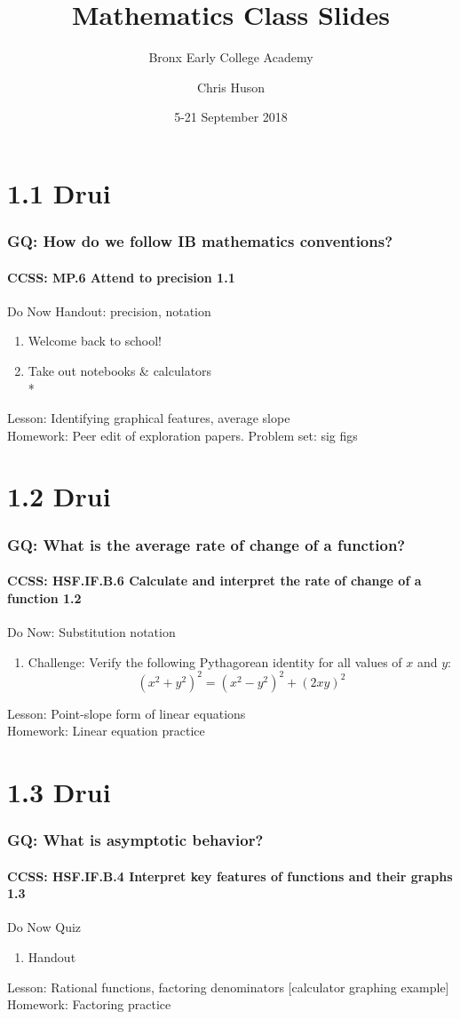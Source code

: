 \documentclass{beamer}
\title{Mathematics Class Slides}
\subtitle{Bronx Early College Academy}
\author{Chris Huson}
\date{5-21 September 2018}
\begin{document}
\frame{\titlepage}


  \section{1.1 Drui}
  \frame
  {
    \frametitle{GQ: How do we follow IB mathematics conventions?}
    \framesubtitle{CCSS: MP.6 Attend to precision \qquad \alert{1.1}}

    \begin{block}{Do Now Handout: precision, notation}
    \begin{enumerate}
        \item Welcome back to school!
        \item Take out notebooks \& calculators\\*
    \end{enumerate}
    \end{block}
    Lesson: Identifying graphical features, average slope \\%
    Homework: Peer edit of exploration papers. Problem set: sig figs
  }

  \section{1.2 Drui}
  \frame
  {
    \frametitle{GQ: What is the average rate of change of a function?}
    \framesubtitle{CCSS: HSF.IF.B.6 Calculate and interpret the rate of change of a function \qquad \alert{1.2}}

    \begin{block}{Do Now: Substitution notation}
    \begin{enumerate}
        \item Challenge: %
        Verify the following Pythagorean identity for all values of $x$ and $y$:
        \[(x^2+y^2)^2=(x^2-y^2)^2+(2xy)^2\]
    \end{enumerate}
    \end{block}
    Lesson: Point-slope form of linear equations
    \\%
    Homework: Linear equation practice
  }

  \section{1.3 Drui}
  \frame
  {
    \frametitle{GQ: What is asymptotic behavior?}
    \framesubtitle{CCSS: HSF.IF.B.4 Interpret key features of functions and their graphs \qquad \alert{1.3}}

    \begin{block}{Do Now Quiz}
    \begin{enumerate}
        \item Handout
    \end{enumerate}
    \end{block}
    Lesson: Rational functions, factoring denominators [calculator graphing example]
    \\%
    Homework: Factoring practice
  }
\end{document}
